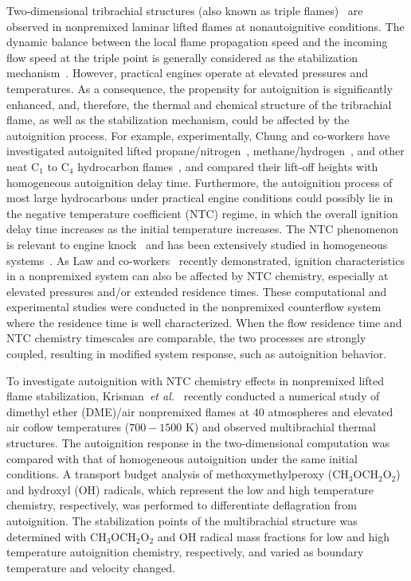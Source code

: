 \documentclass[review,3p,times]{elsarticle}
\begin{document}
\textcolor{Rv1}{Two-dimensional tribrachial structures (also known as triple flames)~\cite{buckmaster02} are observed in nonpremixed laminar lifted flames at nonautoignitive conditions.  The dynamic balance between the local flame propagation speed and the incoming flow speed at the triple point is generally considered as the stabilization mechanism~\cite{chung07}.}  However, practical engines operate at elevated pressures and temperatures.  As a consequence, the propensity for autoignition is significantly enhanced, and, therefore, the thermal and chemical structure of the tribrachial flame, as well as the stabilization mechanism, could be affected by the autoignition process.  \textcolor{Rv1}{For example, experimentally, Chung and co-workers have investigated autoignited lifted propane/nitrogen~\cite{choi09}, methane/hydrogen~\cite{choi12}, and other neat C$_1$ to C$_4$ hydrocarbon flames~\cite{choi10}, and compared their lift-off heights with homogeneous autoignition delay time.}  Furthermore, the autoignition process of most large hydrocarbons under practical engine conditions could possibly lie in the negative temperature coefficient (NTC) regime, in which the overall ignition delay time increases as the initial temperature increases.  The NTC phenomenon is relevant to engine knock~\cite{battin-leclerc08} and has been extensively studied in homogeneous systems~\cite{zador11}.  As Law and co-workers~\cite{law12,zhao13,deng14} recently demonstrated, ignition characteristics in a nonpremixed system can also be affected by NTC chemistry, especially at elevated pressures and/or extended residence times.  These computational and experimental studies were conducted in the nonpremixed counterflow system where the residence time is well characterized.  When the flow residence time and NTC chemistry timescales are comparable, the two processes are strongly coupled, resulting in modified system response, such as autoignition behavior.

To investigate autoignition with NTC chemistry effects in nonpremixed lifted flame stabilization, Krisman~\emph{et al.}~\cite{krisman14} recently conducted a numerical study of dimethyl ether (DME)/air nonpremixed flames at $40$ atmospheres and elevated air coflow temperatures ($700-1500$ K) and observed multibrachial thermal structures.  The autoignition response in the two-dimensional computation was compared with that of homogeneous autoignition under the same initial conditions.  A transport budget analysis of methoxymethylperoxy (CH$_3$OCH$_2$O$_2$) and hydroxyl (OH) radicals, which represent the low and high temperature chemistry, respectively, was performed to differentiate deflagration from autoignition.  The stabilization points of the multibrachial structure was determined with CH$_3$OCH$_2$O$_2$ and OH radical mass fractions for low and high temperature autoignition chemistry, respectively, and varied as boundary temperature and velocity changed.
\end{document}
